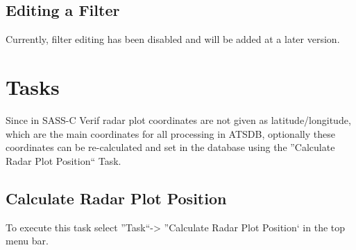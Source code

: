 \documentclass[10pt,letterpaper,extrafontsizes]{memoir}
\begin{document}
\subsection{Editing a Filter}
\label{sec:filter_editing}

Currently, filter editing has been disabled and will be added at a later version.




\section{Tasks}
\label{sec:tasks}

Since in SASS-C Verif radar plot coordinates are not given as latitude/longitude, which are the main coordinates for all processing in ATSDB, optionally these coordinates can be re-calculated and set in the database using the ''Calculate Radar Plot Position`` Task.

\subsection{Calculate Radar Plot Position}
To execute this task select ''Task``->  ''Calculate Radar Plot Position` in the top menu bar.
\end{document}
